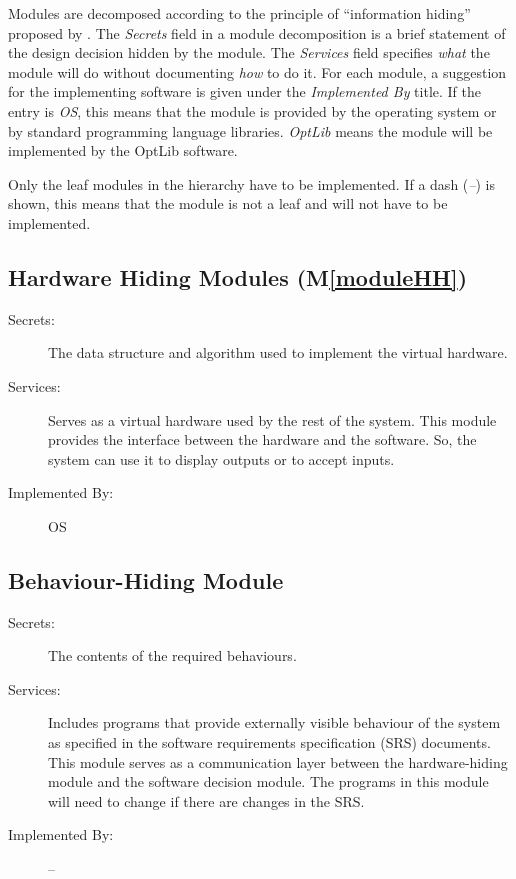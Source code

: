 \documentclass[12pt, titlepage]{article}
\newcommand{\mref}[1]{M\ref{#1}}
\begin{document}
Modules are decomposed according to the principle of ``information hiding''
proposed by \citet{ParnasEtAl1984}. The \emph{Secrets} field in a module
decomposition is a brief statement of the design decision hidden by the
module. The \emph{Services} field specifies \emph{what} the module will do
without documenting \emph{how} to do it. For each module, a suggestion for the
implementing software is given under the \emph{Implemented By} title. If the
entry is \emph{OS}, this means that the module is provided by the operating
system or by standard programming language libraries.  \emph{OptLib} means the
module will be implemented by the OptLib software.

Only the leaf modules in the hierarchy have to be implemented. If a dash
(\emph{--}) is shown, this means that the module is not a leaf and will not have
to be implemented.

\subsection{Hardware Hiding Modules (\mref{moduleHH})}

\begin{description}
\item[Secrets:]The data structure and algorithm used to implement the virtual
  hardware.
\item[Services:]Serves as a virtual hardware used by the rest of the
  system. This module provides the interface between the hardware and the
  software. So, the system can use it to display outputs or to accept inputs.
\item[Implemented By:] OS
\end{description}

\subsection{Behaviour-Hiding Module}

\begin{description}
\item[Secrets:]The contents of the required behaviours.
\item[Services:]Includes programs that provide externally visible behaviour of
  the system as specified in the software requirements specification (SRS)
  documents. This module serves as a communication layer between the
  hardware-hiding module and the software decision module. The programs in this
  module will need to change if there are changes in the SRS.
\item[Implemented By:] --
\end{description}
\end{document}
